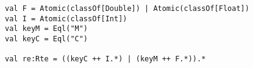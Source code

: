 \begin{lstlisting}[style=scalaioScala]
val F = Atomic(classOf[Double]) | Atomic(classOf[Float])
val I = Atomic(classOf[Int])
val keyM = Eql("M")
val keyC = Eql("C")

val re:Rte = ((keyC ++ I.*) | (keyM ++ F.*)).*
\end{lstlisting}
